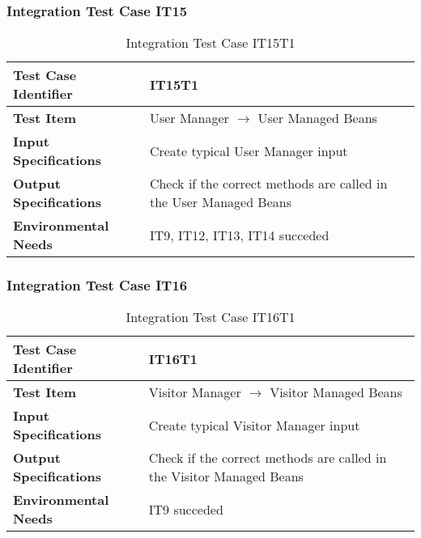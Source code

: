 \subsubsection{Integration Test Case IT15} \label{sssec:IT15}
\vspace{16pt}
\begin{table}[htbp]
\begin{center}
\renewcommand{\arraystretch}{1.5}
\begin{tabular}{l|p{}}
\hline
\textbf{Test Case Identifier} & IT15T1\\
\hline
\textbf{Test Item} & User Manager $\rightarrow$ User Managed Beans\\
\hline
\textbf{Input Specifications} & Create typical User Manager input \\
\hline
\textbf{Output Specifications} & Check if the correct methods are called in the User Managed Beans \\
\hline
\textbf{Environmental Needs} & IT9, IT12, IT13, IT14 succeded\\
\hline
\end{tabular}
\caption{Integration Test Case IT15T1}
\end{center}
\end{table}

\vspace{10pt}
\subsubsection{Integration Test Case IT16} \label{sssec:IT16}
\vspace{16pt}
\begin{table}[htbp]
\begin{center}
\renewcommand{\arraystretch}{1.5}
\begin{tabular}{l|p{}}
\hline
\textbf{Test Case Identifier} & IT16T1\\
\hline
\textbf{Test Item} & Visitor Manager $\rightarrow$ Visitor Managed Beans\\
\hline
\textbf{Input Specifications} & Create typical Visitor Manager input \\
\hline
\textbf{Output Specifications} & Check if the correct methods are called in the Visitor Managed Beans \\
\hline
\textbf{Environmental Needs} & IT9 succeded\\
\hline
\end{tabular}
\caption{Integration Test Case IT16T1}
\end{center}
\end{table}
\clearpage

